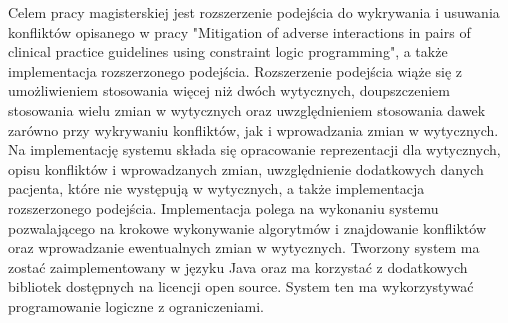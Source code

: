\begin{spacing}{1.5}

Celem pracy magisterskiej jest rozszerzenie podejścia do wykrywania i usuwania konfliktów opisanego w pracy "Mitigation of adverse interactions in pairs of clinical practice guidelines using constraint logic programming", a także implementacja rozszerzonego podejścia. Rozszerzenie podejścia wiąże się z umożliwieniem stosowania więcej niż dwóch wytycznych, doupszczeniem stosowania wielu zmian w wytycznych oraz uwzględnieniem stosowania dawek zarówno przy wykrywaniu konfliktów, jak i wprowadzania zmian w wytycznych. Na implementację systemu składa się opracowanie reprezentacji dla wytycznych, opisu konfliktów i wprowadzanych zmian, uwzględnienie dodatkowych danych pacjenta, które nie występują w wytycznych, a także implementacja rozszerzonego podejścia. Implementacja polega na wykonaniu systemu pozwalającego na krokowe wykonywanie algorytmów i znajdowanie konfliktów oraz wprowadzanie ewentualnych zmian w wytycznych. Tworzony system ma zostać zaimplementowany w języku Java oraz ma korzystać z dodatkowych bibliotek dostępnych na licencji open source. System ten ma wykorzystywać programowanie logiczne z ograniczeniami.



\end{spacing}
